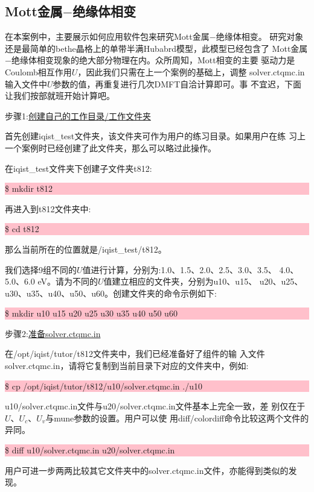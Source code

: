\subsection{Mott金属$-$绝缘体相变}
\label{subsec:mott}

在本案例中，主要展示如何应用{\iqist}软件包来研究Mott金属$-$绝缘体相变。
研究对象还是最简单的bethe晶格上的单带半满Hubabrd模型，此模型已经包含了
Mott金属$-$绝缘体相变现象的绝大部分物理在内。众所周知，Mott相变的主要
驱动力是Coulomb相互作用$U$，因此我们只需在上一个案例的基础上，调整
solver.ctqmc.in输入文件中$U$参数的值，再重复进行几次DMFT自洽计算即可。事
不宜迟，下面让我们按部就班开始计算吧。

步骤1:\underline{创建自己的工作目录/工作文件夹}

首先创建iqist\_test文件夹，该文件夹可作为用户的练习目录。如果用户在练
习上一个案例时已经创建了此文件夹，那么可以略过此操作。

在iqist\_test文件夹下创建子文件夹t812:

\noindent\colorbox{pink}{\parbox[r]{\linewidth}{\quad \$ mkdir t812 }}

再进入到t812文件夹中:

\noindent\colorbox{pink}{\parbox[r]{\linewidth}{\quad \$ cd t812 }}

那么当前所在的位置就是/iqist\_test/t812。

我们选择9组不同的$U$值进行计算，分别为:1.0、1.5、2.0、2.5、3.0、3.5、
4.0、5.0、6.0 eV。请为不同的$U$值建立相应的文件夹，分别为u10、u15、
u20、u25、u30、u35、u40、u50、u60。创建文件夹的命令示例如下:

\noindent\colorbox{pink}{\parbox[r]{\linewidth}{\quad \$ mkdir u10 u15 u20 u25 u30 u35 u40 u50 u60}}

步骤2:\underline{准备solver.ctqmc.in}

在/opt/iqist/tutor/t812文件夹中，我们已经准备好了{\azalea}组件的输
入文件solver.ctqmc.in，请将它复制到当前目录下对应的文件夹中，例如:

\noindent\colorbox{pink}{\parbox[r]{\linewidth}{\quad \$ cp /opt/iqist/tutor/t812/u10/solver.ctqmc.in ./u10 }}

u10/solver.ctqmc.in文件与u20/solver.ctqmc.in文件基本上完全一致，差
别仅在于$U$、$U_{c}$、$U_{v}$与mune参数的设置。用户可以使
用diff/colordiff命令比较这两个文件的异同。

\noindent\colorbox{pink}{\parbox[r]{\linewidth}{\quad \$ diff u10/solver.ctqmc.in u20/solver.ctqmc.in }}

用户可进一步两两比较其它文件夹中的solver.ctqmc.in文件，亦能得到类似的发现。

